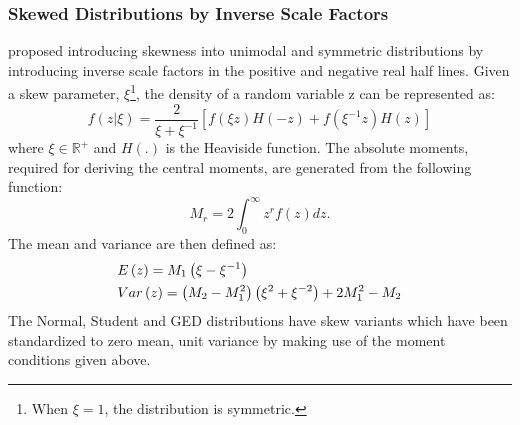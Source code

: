 \subsubsection{Skewed Distributions by Inverse Scale Factors}\label{skewdist}
\cite{Fernandez1998} proposed introducing skewness into unimodal and symmetric
distributions by introducing inverse scale factors in the positive and negative
real half lines. Given a skew parameter, $\xi$\footnote{When $\xi=1$, the
distribution is symmetric.}, the density of a random variable z can be
represented as:
\begin{equation}\label{eq:skew1}
f\left( {z|\xi } \right) = \frac{2}
{{\xi  + {\xi ^{ - 1}}}}\left[ {f\left( {\xi z} \right)H\left( { - z} \right) + f\left( {{\xi ^{ - 1}}z} \right)H\left( z \right)} \right]
\end{equation}
where $\xi  \in {\mathbb{R}^ + }$ and $H(.)$ is the Heaviside function. The
absolute moments, required for deriving the central moments, are generated from
the following function:
\begin{equation}\label{eq:skew2}
{M_r} = 2\int_0^\infty  {{z^r}f\left( z \right)dz}.
\end{equation}
The mean and variance are then defined as:
\begin{equation}\label{eq:skew3}
\begin{gathered}
  E\left( z \right) = {M_1}\left( {\xi  - {\xi ^{ - 1}}} \right) \hfill \\
  Var\left( z \right) = \left( {{M_2} - M_1^2} \right)\left( {{\xi ^2} + {\xi ^{ - 2}}} \right) + 2M_1^2 - {M_2} \hfill \\
\end{gathered}
\end{equation}
The Normal, Student and GED distributions have skew variants which have been
standardized to zero mean, unit variance by making use of the moment conditions
given above.

